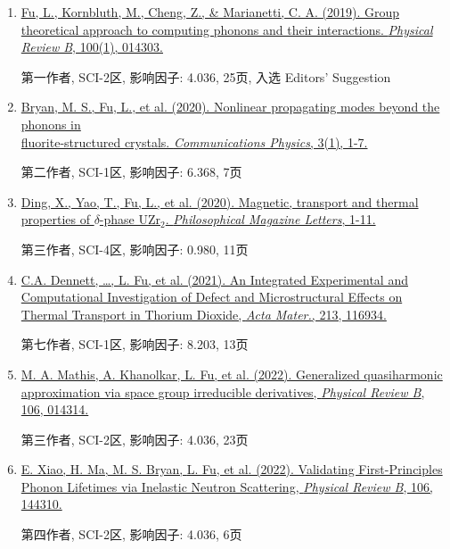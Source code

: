 \documentclass[
  a4paper,
  12pt
]{cv}
\begin{document}
\begin{enumerate}
\item
\href{https://doi.org/10.1103/PhysRevB.100.014303}
{\underline{Fu, L.}, Kornbluth, M., Cheng, Z., \& Marianetti, C. A. (2019). 
Group theoretical approach to computing phonons and their interactions. 
\textit{Physical Review B}, 100(1), 014303.}

第一作者, SCI-2区, 影响因子: 4.036, 25页, 入选 Editors' Suggestion
%
\item
\href{https://doi.org/10.1038/s42005-020-00483-2}{
Bryan, M. S., \underline{Fu, L.}, et al. (2020). 
Nonlinear propagating modes beyond the phonons in \\fluorite-structured crystals.
\textit{Communications Physics}, 3(1), 1-7.}

第二作者, SCI-1区, 影响因子: 6.368, 7页
%
\item
\href{https://doi.org/10.1080/09500839.2020.1833375}{
Ding, X., Yao, T., \underline{Fu, L.}, et al. (2020).
Magnetic, transport and thermal properties of $\delta$-phase UZr$_{2}$.
\textit{Philosophical Magazine Letters}, 1-11.}

第三作者, SCI-4区, 影响因子: 0.980, 11页
%
\item
\href{https://doi.org/10.1016/j.actamat.2021.116934}{
C.A. Dennett, \dots, \underline{L. Fu}, et al. (2021).
An Integrated Experimental and Computational Investigation of Defect and Microstructural Effects on Thermal Transport in Thorium Dioxide, %
\textit{Acta Mater.}, 213, 116934.
}

第七作者, SCI-1区, 影响因子: 8.203, 13页
%
\item
\href{https://doi.org/10.1103/PhysRevB.106.014314}{
M. A. Mathis, A. Khanolkar, \underline{L. Fu}, et al. (2022).
Generalized quasiharmonic approximation via space group irreducible derivatives,
\textit{Physical Review B}, 106, 014314.
}

第三作者, SCI-2区, 影响因子: 4.036, 23页

\item
\href{https://doi.org/10.1103/PhysRevB.106.144310}{
E. Xiao, H. Ma, M. S. Bryan, \underline{L. Fu}, et al. (2022).
Validating First-Principles Phonon Lifetimes via Inelastic Neutron Scattering,
\textit{Physical Review B}, 106, 144310.
}

第四作者, SCI-2区, 影响因子: 4.036, 6页

%
\end{enumerate}
\end{document}
